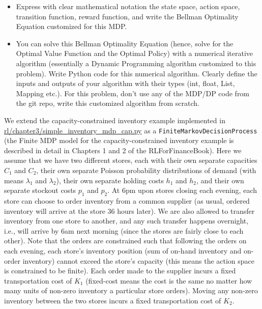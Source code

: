 \documentclass[12pt]{exam}
\begin{document}
\begin{questions}
\begin{itemize}
	\item Express with clear mathematical notation the state space, action space, transition function, reward function, and write the Bellman Optimality Equation customized for this MDP.
	\item You can solve this Bellman Optimality Equation (hence, solve for the Optimal Value Function and the Optimal Policy) with a numerical iterative algorithm (essentially a Dynamic Programming algorithm customized to this problem). Write Python code for this numerical algorithm. Clearly define the inputs and outputs of your algorithm with their types (int, float, List, Mapping etc.). For this problem, don't use any of the MDP/DP code from the git repo, write this customized algorithm from scratch.
\end{itemize}

 We extend the capacity-constrained inventory example implemented in \href{https://github.com/TikhonJelvis/RL-book/blob/master/rl/chapter3/simple_inventory_mdp_cap.py}{rl\//chapter3\//simple\_inventory\_mdp\_cap.py} as a \lstinline{FiniteMarkovDecisionProcess} (the Finite MDP model for the capacity-constrained inventory example is described in detail in Chapters 1 and 2 of the RLForFinanceBook). Here we assume that we have two different stores, each with their own separate capacities $C_1$ and $C_2$, their own separate Poisson probability distributions of demand (with means $\lambda_1$ and $\lambda_2$), their own separate holding costs $h_1$ and $h_2$, and their own separate stockout costs $p_1$ and $p_2$. At 6pm upon stores closing each evening, each store can choose to order inventory from a common supplier (as usual, ordered inventory will arrive at the store 36 hours later). We are also allowed to transfer inventory from one store to another, and any such transfer happens overnight, i.e., will arrive by 6am next morning (since the stores are fairly close to each other). Note that the orders are constrained such that following the orders on each evening, each store's inventory position (sum of on-hand inventory and on-order inventory) cannot exceed the store's capacity (this means the action space is constrained to be finite). Each order made to the supplier incurs a fixed transportation cost of $K_1$ (fixed-cost means the cost is the same no matter how many units of non-zero inventory a particular store orders). Moving any non-zero inventory between the two stores incurs a fixed transportation cost of $K_2$. 


\end{questions}
\end{document}
